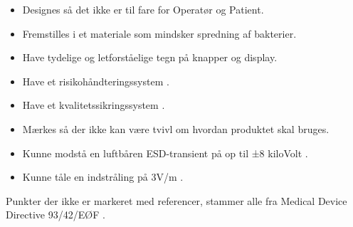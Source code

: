 \begin{itemize}
\item Designes så det ikke er til fare for Operatør og Patient. 
\item Fremstilles i et materiale som mindsker spredning af bakterier. 
\item Have tydelige og letforståelige tegn på knapper og display.
\item Have et risikohåndteringssystem \cite{13485}.
\item Have et kvalitetssikringssystem \cite{14971}. 
\item Mærkes så der ikke kan være tvivl om hvordan produktet skal bruges.
\item Kunne modstå en luftbåren ESD-transient på op til ±8 kiloVolt \cite{60601}.
\item Kunne tåle en indstråling på 3V/m \cite{60601}.
\end{itemize}

Punkter der ikke er markeret med referencer, stammer alle fra Medical Device Directive 93/42/EØF \cite{MDD}. 